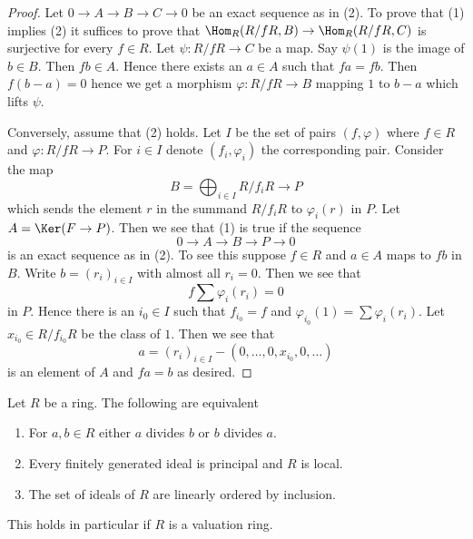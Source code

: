 \begin{proof}
Let $0 \to A \to B \to C \to 0$ be an exact sequence as in (2).
To prove that (1) implies (2) it suffices to prove that
$\Hom_R(R/fR, B) \to \Hom_R(R/fR, C)$ is surjective for every $f \in R$.
Let $\psi : R/fR \to C$ be a map. Say $\psi(1)$ is the image
of $b \in B$. Then $fb \in A$. Hence there exists an $a \in A$
such that $fa = fb$. Then $f(b - a) = 0$ hence we get a morphism
$\varphi : R/fR \to B$ mapping $1$ to $b - a$ which lifts $\psi$.

\medskip\noindent
Conversely, assume that (2) holds. Let $I$ be the set of pairs
$(f, \varphi)$ where $f \in R$ and $\varphi : R/fR \to P$. For
$i \in I$ denote $(f_i, \varphi_i)$ the corresponding pair.
Consider the map
$$
B = \bigoplus\nolimits_{i \in I} R/f_iR \longrightarrow P
$$
which sends the element $r$ in the summand $R/f_iR$ to $\varphi_i(r)$ in $P$.
Let $A = \Ker(F \to P)$. Then we see that (1) is true if the sequence
$$
0 \to A \to B \to P \to 0
$$
is an exact sequence as in (2). To see this suppose $f \in R$ and
$a \in A$ maps to $f b$ in $B$. Write $b = (r_i)_{i \in I}$ with
almost all $r_i = 0$. Then we see that
$$
f\sum \varphi_i(r_i) = 0
$$
in $P$. Hence there is an $i_0 \in I$ such that $f_{i_0} = f$ and
$\varphi_{i_0}(1) = \sum \varphi_i(r_i)$. Let $x_{i_0} \in R/f_{i_0}R$
be the class of $1$. Then we see that
$$
a = (r_i)_{i \in I} - (0, \ldots, 0, x_{i_0}, 0, \ldots )
$$
is an element of $A$ and $fa = b$ as desired.
\end{proof}

\begin{lemma}
\label{lemma-generalized-valuation-ring}
\begin{reference}
\cite{Warfield-Decomposition}
\end{reference}
Let $R$ be a ring. The following are equivalent
\begin{enumerate}
\item For $a, b \in R$ either $a$ divides $b$ or $b$ divides $a$.
\item Every finitely generated ideal is principal and $R$ is local.
\item The set of ideals of $R$ are linearly ordered by inclusion.
\end{enumerate}
This holds in particular if $R$ is a valuation ring.
\end{lemma}

